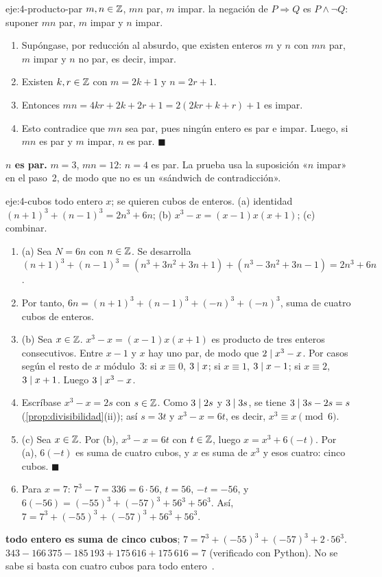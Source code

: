 \begin{solucion}{eje:4-producto-par}
\datos $m,n\in\mathbb{Z}$, $mn$ par, $m$ impar.
\planteamiento la negación de $P\Rightarrow Q$ es $P\wedge\neg Q$: suponer $mn$ par, $m$ impar y $n$ impar.
\pasos
\begin{enumerate}[label=\arabic*.]
  \item Supóngase, por reducción al absurdo, que existen enteros $m$ y $n$ con $mn$ par, $m$ impar y $n$ no par, es decir, impar.
  \item Existen $k,r\in\mathbb{Z}$ con $m=2k+1$ y $n=2r+1$.
  \item Entonces $mn=4kr+2k+2r+1=2(2kr+k+r)+1$ es impar.
  \item Esto contradice que $mn$ sea par, pues ningún entero es par e impar. Luego, si $mn$ es par y $m$ impar, $n$ es par. $\blacksquare$
\end{enumerate}
\resultado \textbf{$n$ es par.}
\comprobacion $m=3$, $mn=12$: $n=4$ es par. La prueba usa la suposición «$n$ impar» en el paso~2, de modo que no es un «sándwich de contradicción».
\end{solucion}

\begin{solucion}{eje:4-cubos}
\datos todo entero $x$; se quieren cubos de enteros.
\planteamiento (a) identidad $(n+1)^{3}+(n-1)^{3}=2n^{3}+6n$; (b) $x^{3}-x=(x-1)x(x+1)$; (c) combinar.
\pasos
\begin{enumerate}[label=\arabic*.]
  \item (a) Sea $N=6n$ con $n\in\mathbb{Z}$. Se desarrolla $(n+1)^{3}+(n-1)^{3}=(n^{3}+3n^{2}+3n+1)+(n^{3}-3n^{2}+3n-1)=2n^{3}+6n$.
  \item Por tanto, $6n=(n+1)^{3}+(n-1)^{3}+(-n)^{3}+(-n)^{3}$, suma de cuatro cubos de enteros.
  \item (b) Sea $x\in\mathbb{Z}$. $x^{3}-x=(x-1)x(x+1)$ es producto de tres enteros consecutivos. Entre $x-1$ y $x$ hay uno par, de modo que $2\mid x^{3}-x$. Por casos según el resto de $x$ módulo~3: si $x\equiv 0$, $3\mid x$; si $x\equiv 1$, $3\mid x-1$; si $x\equiv 2$, $3\mid x+1$. Luego $3\mid x^{3}-x$.
  \item Escríbase $x^{3}-x=2s$ con $s\in\mathbb{Z}$. Como $3\mid 2s$ y $3\mid 3s$, se tiene $3\mid 3s-2s=s$ (\cref{prop:divisibilidad}(ii)); así $s=3t$ y $x^{3}-x=6t$, es decir, $x^{3}\equiv x\pmod 6$.
  \item (c) Sea $x\in\mathbb{Z}$. Por (b), $x^{3}-x=6t$ con $t\in\mathbb{Z}$, luego $x=x^{3}+6(-t)$. Por (a), $6(-t)$ es suma de cuatro cubos, y $x$ es suma de $x^{3}$ y esos cuatro: cinco cubos. $\blacksquare$
  \item Para $x=7$: $7^{3}-7=336=6\cdot 56$, $t=56$, $-t=-56$, y $6(-56)=(-55)^{3}+(-57)^{3}+56^{3}+56^{3}$. Así, $7=7^{3}+(-55)^{3}+(-57)^{3}+56^{3}+56^{3}$.
\end{enumerate}
\resultado \textbf{todo entero es suma de cinco cubos}; $7=7^{3}+(-55)^{3}+(-57)^{3}+2\cdot 56^{3}$.
\comprobacion $343-166\,375-185\,193+175\,616+175\,616=7$ (verificado con Python). No se sabe si basta con cuatro cubos para todo entero~\cite{cs103}.
\end{solucion}

